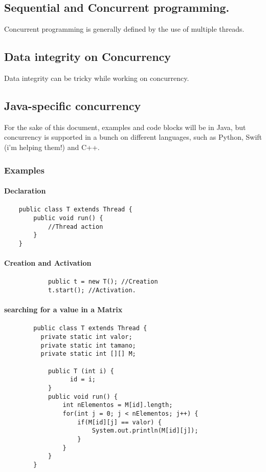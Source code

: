 \documentclass[12pt,a4paper,teal]{bbe}
\begin{document}
	\subsection{Sequential and Concurrent programming.}
	\begin{definition}
		Concurrent programming is generally defined by the use of multiple threads.

	\end{definition}

	\subsection{Data integrity on Concurrency}
	Data integrity can be tricky while working on concurrency.

	\subsection{Java-specific concurrency}
		\begin{remark}
			For the sake of this document, examples and code blocks will be in Java,
			but concurrency is supported in a bunch on different languages, such
			as Python, Swift (i'm helping them!) and C++.
		\end{remark}
	\subsubsection{Examples}
	\paragraph*{Declaration}
	\begin{verbatim}
	public class T extends Thread {
	    public void run() {
	    	//Thread action
	    }
	}
	\end{verbatim}
	

	\paragraph{Creation and Activation}
		\begin{verbatim}
			public t = new T(); //Creation
			t.start(); //Activation.	
		\end{verbatim}
	
	\paragraph{searching for a value in a Matrix}
	\begin{verbatim}
		public class T extends Thread {
		  private static int valor;
		  private static int tamano;
		  private static int [][] M;

		    public T (int i) {
			      id = i;
		    }
		    public void run() {
		    	int nElementos = M[id].length;
		        for(int j = 0; j < nElementos; j++) {
		            if(M[id][j] == valor) {
			            System.out.println(M[id][j]);
			        }
		        }
		    }
		}
	
	\end{verbatim}
\end{document}
